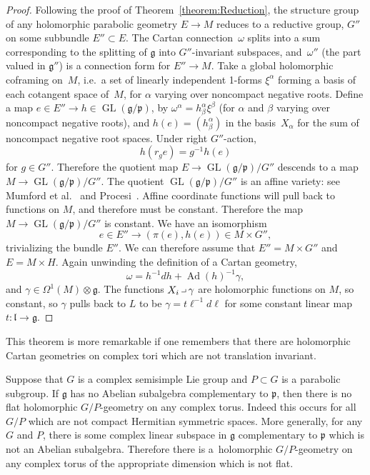 \documentclass[pdftex]{sigma}
\newcommand{\hook}{\ensuremath{\mathbin{ \hbox{\vrule height1.4pt
        width4pt depth-1pt \vrule height4pt width0.4pt depth-1pt}}}}
\newcommand{\GL}[1]{\operatorname{GL}\left({#1}\right)}
\newcommand{\nForms}[2]{\ensuremath{\Omega^{#1} \left ( {#2} \right
    )}}
\DeclareMathOperator{\Ad}{Ad}
\newcommand{\LieG}{\ensuremath{\mathfrak{g}}}
\newcommand{\LieP}{\ensuremath{\mathfrak{p}}}
\newcommand{\LieL}{\ensuremath{\mathfrak{l}}}
\newcommand{\gtot}{\mathfrak{g}}
\newcommand{\gstruc}{\mathfrak{p}}
\begin{document}
\begin{proof}
Following the proof of Theorem~\ref{theorem:Reduction}, the structure group of any
holomorphic parabolic geometry $E \to M$ reduces to a reductive group, $G''$
on some subbundle $E'' \subset E$. The Cartan connection~$\omega$ splits into a sum corresponding to the splitting
of $\mathfrak{g}$ into $G''$-invariant subspaces,
and~$\omega''$ (the part valued in $\mathfrak{g}''$)
is a connection form for $E'' \to M$. Take a global
holomorphic coframing on~$M$, i.e.\ a set of linearly independent 1-forms
$\xi^{\alpha}$ forming a basis of each cotangent space of~$M$, for
$\alpha$ varying over noncompact negative roots.
Def\/ine a map $e \in E'' \to h
\in \GL{\gtot/\gstruc}$, by $\omega^{\alpha}=h^{\alpha}_{\beta}
\xi^{\beta}$ (for $\alpha$ and $\beta$ varying over
noncompact negative roots),
and $h(e) =  (h^{\alpha}_{\beta} )$ in the basis~$X_{\alpha}$ for the sum of noncompact negative
root spaces. Under right
$G''$-action,
\[
h\left(r_{g}e\right)=g^{-1}h(e)
\]
for $g \in G''.$ Therefore the quotient map $E \!\to\! \GL{\gtot/\gstruc}/G''$
descends to a map $M \!\to\! \GL{\gtot/\gstruc}/G''$.
The quotient $\GL{\gtot/\gstruc}/G''$ is an af\/f\/ine variety:
see Mumford et al.~\cite[Theorem~1.1, p.~27]{Mumford/Fogarty/Kirwan:1994}
and Procesi~\cite[Theorem~2, p.~556]{Procesi:2007}.
Af\/f\/ine coordinate functions will pull back to functions on $M$,
and therefore must be constant.
Therefore the map $M \to \GL{\gtot/\gstruc}/G''$ is constant.
We have an isomorphism
\[
e \in E'' \to \left(\pi(e),h(e)\right) \in M \times G'',
\]
trivializing the bundle $E''$. We can therefore assume
that $E'' = M \times G''$ and $E = M \times H$.
Again unwinding the def\/inition of a Cartan
geometry,
\[
\omega = h^{-1}   dh + \Ad(h)^{-1}\gamma,
\]
and $\gamma \in \nForms{1}{M} \otimes \LieG$.
The functions $X_i \hook \gamma$
are holomorphic functions on $M$,
so constant, so $\gamma$ pulls back to $L$ to be
$\gamma=t \ell^{-1}   d\ell$ for some constant
linear map $t : \LieL \to \LieG$.
\end{proof}

\begin{remark}
This theorem is more remarkable if one remembers that there
are holomorphic Cartan geometries on complex tori which are
not translation invariant.
\end{remark}

\begin{remark}
Suppose that $G$ is a complex semisimple Lie group and $P \subset G$
is a parabolic subgroup. If $\LieG$ has no Abelian subalgebra complementary
to $\LieP$, then there is no f\/lat holomorphic $G/P$-geometry
on any complex torus. Indeed this occurs for all $G/P$
which are not compact Hermitian symmetric spaces.
More generally, for any $G$ and $P$, there is some complex linear subspace
in $\LieG$ complementary to $\LieP$ which is not an Abelian
subalgebra. Therefore there is a~holomorphic $G/P$-geometry
on any complex torus of the appropriate dimension which
is not f\/lat.
\end{remark}
\end{document}
